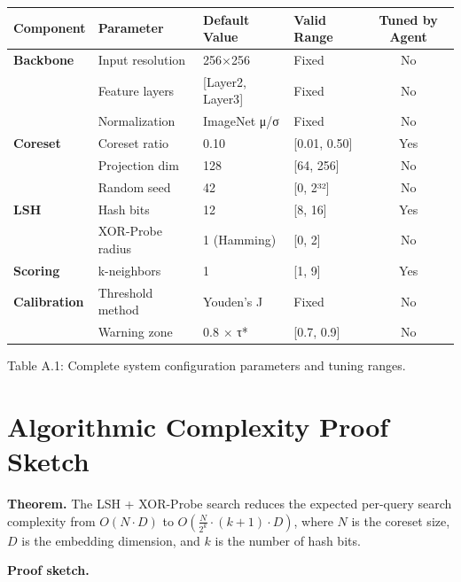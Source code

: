 \documentclass[12pt, a4paper, oneside]{report}
\begin{document}
{\def\LTcaptype{none} %
\begin{longtable}[]{@{}llllc@{}}
\toprule\noalign{}
Component & Parameter & Default Value & Valid Range & Tuned by Agent \\
\midrule\noalign{}
\endhead
\bottomrule\noalign{}
\endlastfoot
\textbf{Backbone} & Input resolution & 256$\times$256 & Fixed & No \\
& Feature layers & {[}Layer2, Layer3{]} & Fixed & No \\
& Normalization & ImageNet μ/σ & Fixed & No \\
\textbf{Coreset} & Coreset ratio & 0.10 & {[}0.01, 0.50{]} & Yes \\
& Projection dim & 128 & {[}64, 256{]} & No \\
& Random seed & 42 & {[}0, 2³²{]} & No \\
\textbf{LSH} & Hash bits & 12 & {[}8, 16{]} & Yes \\
& XOR-Probe radius & 1 (Hamming) & {[}0, 2{]} & No \\
\textbf{Scoring} & k-neighbors & 1 & {[}1, 9{]} & Yes \\
\textbf{Calibration} & Threshold method & Youden's J & Fixed & No \\
& Warning zone & 0.8 $\times$ τ* & {[}0.7, 0.9{]} & No \\
\end{longtable}
}

Table A.1: Complete system configuration parameters and tuning ranges.

\bigskip\noindent\hrulefill\bigskip

\section{\1 Algorithmic Complexity Proof Sketch}\label{appendix-c-algorithmic-complexity-proof-sketch}

\textbf{Theorem.} The LSH + XOR-Probe search reduces the expected per-query search complexity from \(O(N \cdot D)\) to \(O\left(\frac{N}{2^k} \cdot (k+1) \cdot D\right)\), where \(N\) is the coreset size, \(D\) is the embedding dimension, and \(k\) is the number of hash bits.

\textbf{Proof sketch.}
\end{document}
